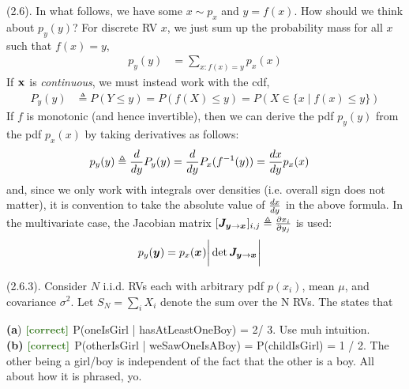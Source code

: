 \documentclass[11pt]{article}
\begin{document}
\myspace
\p {} (2.6). In what follows, we have some $ x \sim p_x$ and $ y = f( x)$. How should we think about $p_y( y)$? For discrete RV $ x$, we just sum up the probability mass for all $x$ such that $f(x)=y$,
\begin{align}
	p_y( y)
		&= \sum_{ x: f( x) =  y} p_x( x)
\end{align}
If $\rvec x$ is \textit{continuous}, we must instead work with the cdf,
\begin{align}
	P_y(y)
		&\triangleq P(Y \le y)
		= P(f(X) \le y) 
		= P(X \in \{x \mid f(x) \le y \})
\end{align}
If $f$ is monotonic (and hence invertible), then we can derive the pdf $p_y(y)$ from the pdf $p_x(x)$ by taking derivatives as follows:
\begin{align}
	p_y(y) 
		&\triangleq \deriv{}{y} P_y(y) = \deriv{}{y} P_x(f^{-1}(y)) = \deriv{x}{y} p_x(x)
\end{align} 
and, since we only work with integrals over densities (i.e. overall sign does not matter), it is convention to take the absolute value of $\deriv{x}{y}$ in the above formula. In the multivariate case, the Jacobian matrix $[\matr[\vec y \rightarrow \vec x]{J}]_{i,j} \triangleq \pderiv{x_i}{y_j}$ is used:
\begin{align}
	p_y(\vec y) 
		&= p_x(\vec x) \bigg| \det \matr[\vec y \rightarrow \vec x]{J}  \bigg|
\end{align}

\myspace
\p {} (2.6.3). Consider $N$ i.i.d. RVs each with arbitrary pdf $p(x_i)$, mean $\mu$, and covariance $\sigma^2$. Let $S_N = \sum_i X_i$ denote the sum over the N RVs. The  states that


\myspace
{}
\myspace

\begin{example}[Exercise 2.1]
	\textbf{(a}) $\mtgreen{[correct]}$ P(oneIsGirl | hasAtLeastOneBoy) = 2/ 3. Use muh intuition. \\
	
	\textbf{(b)} $\mtgreen{[correct]}$ P(otherIsGirl | weSawOneIsABoy) = P(childIsGirl) = 1 / 2. The other being a girl/boy is independent of the fact that the other is a boy. All about how it is phrased, yo. 
\end{example}
\end{document}
